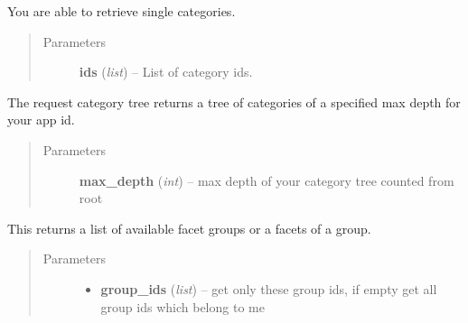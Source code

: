 \documentclass[letterpaper,10pt,english]{sphinxmanual}
\begin{document}
\begin{fulllineitems}
\begin{fulllineitems}
\begin{quote}
\begin{description}
\end{description}\end{quote}

\end{fulllineitems}


\begin{fulllineitems}
\label{collins:collins.Collins.category}
You are able to retrieve single categories.
\begin{quote}\begin{description}
\item[{Parameters}] \leavevmode
\textbf{ids} (\emph{list}) -- List of category ids.

\end{description}\end{quote}

\end{fulllineitems}


\begin{fulllineitems}
\label{collins:collins.Collins.categorytree}
The request category tree returns a tree of categories of a
specified max depth for your app id.
\begin{quote}\begin{description}
\item[{Parameters}] \leavevmode
\textbf{max\_depth} (\emph{int}) -- max depth of your category tree counted from root

\end{description}\end{quote}

\end{fulllineitems}


\begin{fulllineitems}
\label{collins:collins.Collins.facets}
This returns a list of available facet groups or a facets of a group.
\begin{quote}\begin{description}
\item[{Parameters}] \leavevmode\begin{itemize}
\item {} 
\textbf{group\_ids} (\emph{list}) -- get only these group ids, if empty get all
group ids which belong to me


\end{itemize}
\end{description}
\end{quote}
\end{fulllineitems}
\end{fulllineitems}
\end{document}
